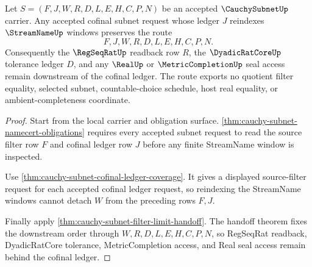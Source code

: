 \begin{theorem}
\label{thm:cauchysubnet-cofinal-reindexing-route}
Let $S=(F,J,W,R,D,L,E,H,C,P,N)$ be an accepted $\CauchySubnetUp$ carrier. Any accepted cofinal subnet request whose ledger $J$ reindexes $\StreamNameUp$ windows preserves the route
$$
F,J,W,R,D,L,E,H,C,P,N .
$$
Consequently the $\RegSeqRatUp$ readback row $R$, the $\DyadicRatCoreUp$ tolerance ledger $D$, and any $\RealUp$ or $\MetricCompletionUp$ seal access remain downstream of the cofinal ledger. The route exports no quotient filter equality, selected subnet, countable-choice schedule, host real equality, or ambient-completeness coordinate.
\end{theorem}
\begin{proof}
Start from the local carrier and obligation surface. \autoref{thm:cauchy-subnet-namecert-obligations} requires every accepted subnet request to read the source filter row $F$ and cofinal ledger row $J$ before any finite StreamName window is inspected.

Use \autoref{thm:cauchy-subnet-cofinal-ledger-coverage}. It gives a displayed source-filter request for each accepted cofinal ledger request, so reindexing the StreamName windows cannot detach $W$ from the preceding rows $F,J$.

Finally apply \autoref{thm:cauchy-subnet-filter-limit-handoff}. The handoff theorem fixes the downstream order through $W,R,D,L,E,H,C,P,N$, so RegSeqRat readback, DyadicRatCore tolerance, MetricCompletion access, and Real seal access remain behind the cofinal ledger.
\end{proof}

